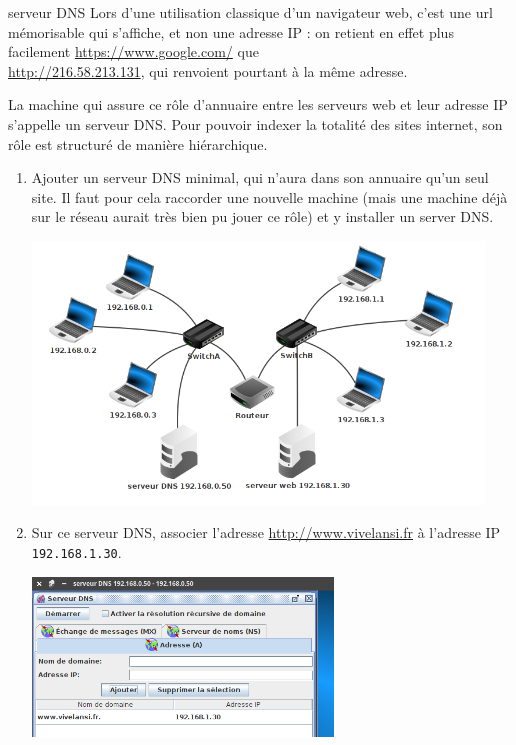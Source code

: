 \documentclass[a4paper,dvipsnames]{article}
\begin{document}
\begin{activite}[breakable]{serveur DNS}{}
  Lors d'une utilisation classique d'un navigateur web, c'est une url mémorisable qui s'affiche, et non une adresse IP : on retient en effet plus facilement \url{https://www.google.com/} que\\ \url{http://216.58.213.131}, qui renvoient pourtant à la même adresse.

  \smallskip

  La machine qui assure ce rôle d'annuaire entre les serveurs web et leur adresse IP s'appelle un {\color{red}serveur DNS}. Pour pouvoir indexer la totalité des sites internet, son rôle est structuré de manière hiérarchique.

  \begin{enumerate}
    \item Ajouter un serveur DNS minimal, qui n'aura dans son annuaire qu'un seul site. Il faut pour cela raccorder une nouvelle machine (mais une machine déjà sur le réseau aurait très bien pu jouer ce rôle) et y installer un server DNS.

      \begin{center}
	\includegraphics[width=12cm]{img/dns.png}
      \end{center}

    \item Sur ce serveur DNS, associer l'adresse \url{http://www.vivelansi.fr} à l'adresse IP \texttt{192.168.1.30}.

      \begin{center}
	\includegraphics[width=8cm]{img/vivelansi.png}
      \end{center}


\end{enumerate}
\end{activite}
\end{document}
